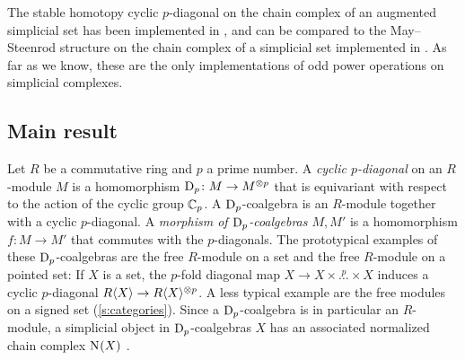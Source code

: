 The stable homotopy cyclic $p$-diagonal on the chain complex of an augmented simplicial set has been implemented in \cite{github-oddp}, and can be compared to the May--Steenrod structure on the chain complex of a simplicial set implemented in \cite{github-comch}. As far as we know, these are the only implementations of odd power operations on simplicial complexes.
 
 
 
 
 \subsection*{Main result} 
Let $R$ be a commutative ring and $p$ a prime number. A \emph{cyclic $p$-diagonal} on an $R$-module $M$ is a homomorphism $\mathrm{D}_p\colon M\to M^{\otimes p}$ that is equivariant with respect to the action of the cyclic group $\mathbb{C}_p$. A $\mathrm{D}_p$-coalgebra is an $R$-module together with a cyclic $p$-diagonal. A \emph{morphism of $\mathrm{D}_p$-coalgebras $M,M'$} is a homomorphism $f\colon M\to M'$ that commutes with the $p$-diagonals. The prototypical examples of these $\mathrm{D}_p$-coalgebras are the free $R$-module on a set and the free $R$-module on a pointed set: If $X$ is a set, the $p$-fold diagonal map $X\to X\times \overset{p}{\ldots}\times X$ induces a cyclic $p$-diagonal $R\langle X\rangle\to R\langle X\rangle^{\otimes p}$. A less typical example are the free modules on a signed set (\cref{s:categories}). Since a $\mathrm{D}_p$-coalgebra is in particular an $R$-module, a simplicial object in $\mathrm{D}_p$-coalgebras $X$ has an associated normalized chain complex $\operatorname{N}_{}(X)$ .


